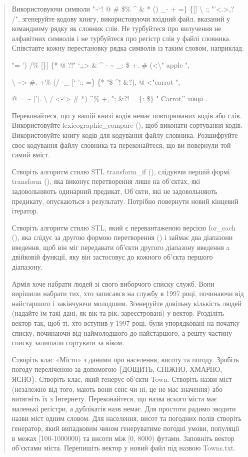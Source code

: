 \documentclass[]{article}
\begin{document}
\begin{quote}
\protect\hypertarget{_Hlk65952617}{}{}Використовуючи символи
"\textasciitilde{}`! @ \# \$\% \^{} \& * () \_- + =\} \{{[}{]}
\textbar{} \textbackslash{} :; "'\textless{}.\textgreater{},? /",
згенеруйте кодову книгу, використовуючи вхідний файл, вказаний у
командному рядку як словник слів. Не турбуйтеся про вилучення не
алфавітних символів і не турбуйтеся про регістр слів у файлі словника.
Співставте кожну перестановку рядка символів із таким словом, наприклад:

"= ') /\% {[}\}{]} \textbar{} \{* @ ?!" `,;\textgreater{} \& \^{} -
\textasciitilde{} \_: \$ +. \# (\textless{}\textbackslash{}" apple ",

\textbar{}{]} \textbackslash{} \textasciitilde{}\textgreater{} \#. +\%
(/ -\_ {[}` ':; =\} \{* "\$ \^{}! \&?), @ \textless{}"carrot ",

@ = \textasciitilde{} {[}'{]}. \textbackslash{} /
\textless{}-`\textgreater{} \# *) \^{}\% +, "; \&?! \_ \{: \textbar{}
\$\} " Carrot'' тощо .

Переконайтеся, що у вашій книзі кодів немає повторюваних кодів або слів.
Використовуйте lexicographic\_compare (), щоб виконати сортування кодів.
Використовуйте книгу кодів для кодування файлу словника. Розшифруйте
своє кодування файлу словника та переконайтеся, що ви повернули той
самий вміст.

Створіть алгоритм стилю STL transform\_if (), слідуючи першій формі
transform (), яка виконує перетворення лише на об'єктах, які
задовольняють одинарний предикат. Об'єкти, які не задовольняють
предикату, опускаються з результату. Потрібно повернути новий кінцевий
ітератор.

Створіть алгоритм стилю STL, який є перевантаженою версією for\_each (),
яка слідує за другою формою перетворення () і займає два діапазони
введення, щоб він міг передавати об'єкти другого діапазону введення a
двійковій функції, яку він застосовує до кожного об'єкта першого
діапазону.

\protect\hypertarget{_Hlk65952131}{}{}Армія хоче набрати людей зі свого
виборчого списку служб. Вони вирішили набрати тих, хто записався на
службу в 1997 році, починаючи від найстаршого і закінчуючи молодшим.
Згенеруйте довільну кількість людей (надайте їм такі дані, як вік та
рік, зареєстровані) у вектор. Розділіть вектор так, щоб ті, хто вступив
у 1997 році, були упорядковані на початку списку, починаючи від
наймолодшого до найстаршого, а решту частину списку залишали сортувати
за віком.

Створіть клас «Місто» з даними про населення, висоту та погоду. Зробіть
погоду переліченою за допомогою \{ДОЩИТЬ, СНІЖНО, ХМАРНО, ЯСНО\}.
Створіть клас, який генерує об'єкти Town. Створіть назви міст (незалежно
від того, мають вони сенс чи ні, це не має значення) або витягніть їх з
Інтернету. Переконайтеся, що назва всього міста має маленькі регістри, а
дублікатів назв немає. Для простоти радимо зводити назви міст одним
словом. Для населення, висот та погодних полів створіть генератор, який
випадковим чином генеруватиме погодні умови, популяції в межах
{[}100-1000000) та висоти між {[}0, 8000) футами. Заповніть вектор
об'єктами міста. Перепишіть вектор у новий файл під назвою Towns.txt.


\end{quote}
\end{document}
